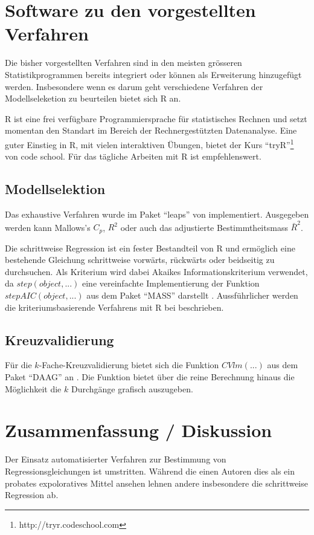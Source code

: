 \documentclass[english,12pt,doc]{apa}
\begin{document}
\section{Software zu den vorgestellten Verfahren}
Die bisher vorgestellten Verfahren sind in den meisten grösseren Statistikprogrammen bereits integriert oder können als Erweiterung hinzugefügt werden.
Insbesondere wenn es darum geht verschiedene Verfahren der Modellseleketion zu beurteilen bietet sich R an.

R ist eine frei verfügbare Programmiersprache für statistisches Rechnen und setzt momentan den Standart im Bereich der Rechnergestützten Datenanalyse. 
Eine guter Einstieg in R, mit vielen interaktiven Übungen, bietet der Kurs ``tryR''\footnote{http://tryr.codeschool.com} von code school.
Für das tägliche Arbeiten mit R ist   empfehlenswert.

\subsection{Modellselektion}
Das exhaustive Verfahren wurde im Paket ``leaps'' von  implementiert. 
Ausgegeben werden kann Mallows's $C_p$, $R^2$ oder auch das adjustierte Bestimmtheitsmass $\bar R^2$.

Die schrittweise Regression ist ein fester Bestandteil von R \cite{R:core} und ermöglich eine bestehende Gleichung schrittweise vorwärts, rückwärts oder beidseitig zu durchsuchen.
Als Kriterium wird dabei Akaikes Informationskriterium verwendet, da $step(object, ...)$ eine vereinfachte Implementierung der Funktion $stepAIC(object, ...)$  aus dem Paket ``MASS'' darstellt \cite{R:MASS}. 
Aussführlicher werden die kriteriumsbasierende Verfahrens mit R bei  beschrieben.

\subsection{Kreuzvalidierung}
Für die $k$-Fache-Kreuzvalidierung bietet sich die Funktion $CVlm(...)$ aus dem Paket ``DAAG'' an \cite{R:DAAG}. 
Die Funktion bietet über die reine Berechnung hinaus die Möglichkeit die $k$ Durchgänge grafisch auszugeben.


\section{Zusammenfassung / Diskussion}
Der Einsatz automatisierter Verfahren zur Bestimmung von Regressionsgleichungen ist umstritten. 
Während die einen Autoren dies als ein probates expoloratives Mittel ansehen lehnen andere insbesondere die schrittweise Regression ab.
\end{document}
